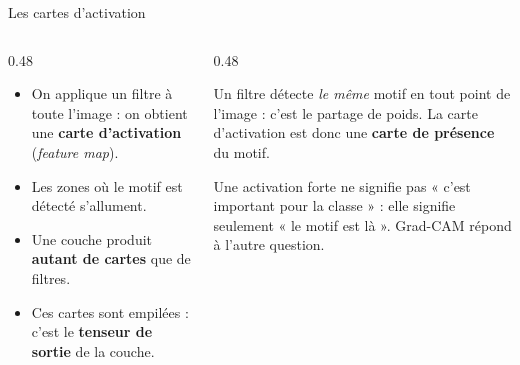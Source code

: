 \begin{frame}{Les cartes d'activation}
\begin{columns}[t]
\begin{column}{0.48\textwidth}
\begin{itemize}
  \item On applique un filtre à toute l'image : on obtient une
  \textbf{carte d'activation} (\emph{feature map}).
  \item Les zones où le motif est détecté s'allument.
  \item Une couche produit \textbf{autant de cartes} que de filtres.
  \item Ces cartes sont empilées : c'est le \textbf{tenseur de sortie}
  de la couche.
\end{itemize}
\end{column}
\begin{column}{0.48\textwidth}
\begin{ebox}
Un filtre détecte \emph{le même} motif en tout point de l'image : c'est le
partage de poids. La carte d'activation est donc une \textbf{carte de présence}
du motif.
\end{ebox}
\begin{wbox}[Attention]
Une activation forte ne signifie pas « c'est important pour la classe » : elle
signifie seulement « le motif est là ». Grad-CAM répond à l'autre question.
\end{wbox}
\end{column}
\end{columns}
\end{frame}

